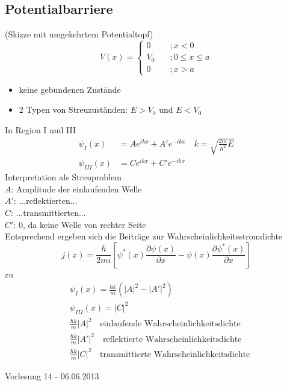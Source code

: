 \documentclass[10pt,article,colorback,accentcolor=tud9d]{scrartcl}
\begin{document}
\subsection{Potentialbarriere}
(Skizze mit umgekehrtem Potentialtopf)
\begin{equation}
V(x)=\left\{
\begin{aligned}
0\quad &;x<0\\
V_0\quad &;0\leq x\leq a\\
0\quad &;x>a
\end{aligned}
\right.
\end{equation}
\begin{itemize}
	\item keine gebundenen Zustände
  \item 2 Typen von Streuzuständen: $E>V_0$ und $E<V_0$
\end{itemize}
In Region I und III
\begin{align}
\psi_{I}(x)&=Ae^{ikx}+A'e^{-ikx} \quad k=\sqrt{\frac{2m}{\hbar^2}E}\\
\psi_{III}(x)&=Ce^{ikx}+C'e^{-ikx}
\end{align}
Interpretation als Streuproblem\\
$A$: Amplitude der einlaufenden Welle\\
$A'$: ...reflektierten...\\
$C$: ...transmittierten...\\
$C'$: 0, da keine Welle von rechter Seite\\
Entsprechend ergeben sich die Beiträge zur Wahrscheinlichkeitsstromdichte
\begin{equation}
j(x)=\frac{\hbar}{2mi}\left[\psi^*(x)\frac{\partial\psi(x)}{\partial x}-\psi(x)\frac{\partial\psi^*(x)}{\partial x}\right]
\end{equation}
zu
\begin{align}
&\psi_{I}(x)=\frac{\hbar k}{m}\left(|A|^2-|A'|^2\right)\\
&\psi_{III}(x)=|C|^2\\
&\frac{\hbar k}{m}|A|^2\quad \text{einlaufende Wahrscheinlichkeitsdichte}\\
&\frac{\hbar k}{m}|A'|^2\quad \text{reflektierte Wahrscheinlichkeitsdichte}\\
&\frac{\hbar k}{m}|C|^2\quad \text{transmittierte Wahrscheinlichkeitsdichte}
\end{align}

\begin{flushright}
Vorlesung 14 - 06.06.2013
\end{flushright}
\end{document}
